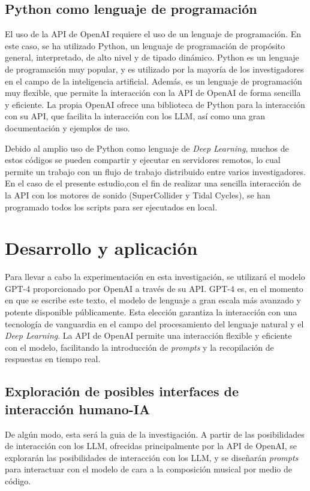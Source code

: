     \subsection{Python como lenguaje de programación}
    El uso de la API de OpenAI requiere el uso de un lenguaje de programación. En este caso, se ha utilizado Python, un lenguaje de programación de propósito general, interpretado, de alto nivel y de tipado dinámico. Python es un lenguaje de programación muy popular, y es utilizado por la mayoría de los investigadores en el campo de la inteligencia artificial. Además, es un lenguaje de programación muy flexible, que permite la interacción con la API de OpenAI de forma sencilla y eficiente. La propia OpenAI ofrece una biblioteca de Python para la interacción con su API, que facilita la interacción con los LLM, así como una gran documentación y ejemplos de uso. 

    Debido al amplio uso de Python como lenguaje de \textit{Deep Learning}, muchos de estos códigos se pueden compartir y ejecutar en servidores remotos, lo cual permite un trabajo con un flujo de trabajo distribuido entre varios investigadores. En el caso de el presente estudio,con el fin de realizar una sencilla interacción de la API con los motores de sonido (SuperCollider y Tidal Cycles), se han programado todos los scripts para ser ejecutados en local.


\section{Desarrollo y aplicación}

Para llevar a cabo la experimentación en esta investigación, se utilizará el modelo GPT-4 proporcionado por OpenAI a través de su API. GPT-4 es, en el momento en que se escribe este texto, el modelo de lenguaje a gran escala más avanzado y potente disponible públicamente. Esta elección garantiza la interacción con una tecnología de vanguardia en el campo del procesamiento del lenguaje natural y el \textit{Deep Learning}. La API de OpenAI permite una interacción flexible y eficiente con el modelo, facilitando la introducción de \textit{prompts} y la recopilación de respuestas en tiempo real.

\subsection{Exploración de posibles interfaces de interacción humano-IA}
De algún modo, esta será la guia de la investigación. A partir de las posibilidades de interacción con los LLM, ofrecidas principalmente por la API de OpenAI, se explorarán las posibilidades de interacción con los LLM, y se diseñarán \textit{prompts} para interactuar con el modelo de cara a la composición musical por medio de código.

